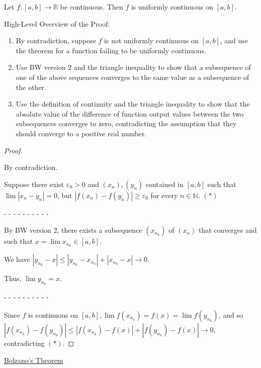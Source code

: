 \documentclass[12pt]{article}
\newcommand{\RR}{\mathbb{R}} %
\newcommand{\NN}{\mathbb{N}}
\newcommand\abs[1]{\left| #1 \right|} %
\newcommand{\eps}{\varepsilon}
\begin{document}
Let $f : [a, b] \rightarrow \RR$ be continuous. Then $f$ is uniformly continuous on $[a, b]$.

\dotfill

High-Level Overview of the Proof:

\begin{enumerate}
\item By contradiction, suppose $f$ is not uniformly continuous on $[a, b]$, and use the theorem for a function failing to be uniformly continuous.

\item Use BW version 2 and the triangle inequality to show that a subsequence of one of the above sequences converges to the same value as a subsequence of the other.

\item Use the definition of continuity and the triangle inequality to show that the absolute value of the difference of function output values between the two subsequences converges to zero, contradicting the assumption that they should converge to a positive real number.
\end{enumerate}

\dotfill

\begin{proof}
$ $

By contradiction.

Suppose there exist $\eps_0 > 0$ and $(x_n), (y_n)$ contained in $[a, b]$ such that
\\
$\lim \abs{x_n - y_n} = 0$, but $\abs{f(x_n) - f(y_n)} \ge \eps_0$ for every $n \in \NN$. $(\ast)$

- - - - - - - - - -

By BW version 2, there exists a subsequence $(x_{n_k})$ of $(x_n)$ that converges and such that $x = \lim x_{n_k} \in [a, b]$.

We have $\abs{y_{n_k} - x} \le \abs{y_{n_k} - x_{n_k}} + \abs{x_{n_k} - x} \rightarrow 0$.

Thus, $\lim y_{n_k} = x$.

- - - - - - - - - -

Since $f$ is continuous on $[a, b], \lim f(x_{n_k}) = f(x) = \lim f(y_{n_k})$, and so
\\
$\abs{f(x_{n_k}) - f(y_{n_k})} \le \abs{f(x_{n_k}) - f(x)} + \abs{f(y_{n_k}) - f(x)} \rightarrow 0$, contradicting $(\ast)$.
\end{proof}

\pagebreak

\underline{Bolzano's Theorem}
\end{document}
